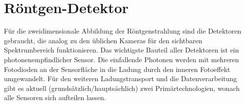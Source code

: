 \chapter{Röntgen-Detektor}
\label{text:moench_theorie}
Für die zweidimensionale Abbildung der Röntgenstrahlung sind die Detektoren gebraucht, die analog zu den üblichen Kameras für den sichtbaren Spektrumbereich funktionieren. Das wichtigste Bauteil aller Detektoren ist ein photonenempfindlicher Sensor. Die einfallende Photonen werden mit mehreren Fotodioden an der Sensorfläche in die Ladung durch den inneren Fotoeffekt umgewandelt. Für den weiteren Ladungstransport und die Datenverarbeitung gibt es aktuell (grundsätzlich/hauptsächlich) zwei Primärtechnologien, wonach alle Sensoren sich aufteilen lassen.


